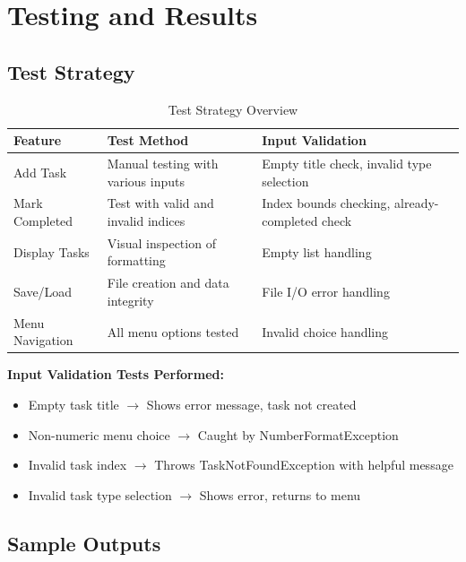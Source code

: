 \documentclass[12pt,a4paper]{article}
\begin{document}
\section{Testing and Results}

\subsection{Test Strategy}

\begin{table}[H]
\centering
\begin{tabular}{|l|p{4cm}|p{5cm}|}
\hline
\textbf{Feature} & \textbf{Test Method} & \textbf{Input Validation} \\
\hline
Add Task & Manual testing with various inputs & Empty title check, invalid type selection \\
\hline
Mark Completed & Test with valid and invalid indices & Index bounds checking, already-completed check \\
\hline
Display Tasks & Visual inspection of formatting & Empty list handling \\
\hline
Save/Load & File creation and data integrity & File I/O error handling \\
\hline
Menu Navigation & All menu options tested & Invalid choice handling \\
\hline
\end{tabular}
\caption{Test Strategy Overview}
\end{table}
\newpage
\textbf{Input Validation Tests Performed:}
\begin{itemize}
    \item Empty task title $\rightarrow$ Shows error message, task not created
    \item Non-numeric menu choice $\rightarrow$ Caught by NumberFormatException
    \item Invalid task index $\rightarrow$ Throws TaskNotFoundException with helpful message
    \item Invalid task type selection $\rightarrow$ Shows error, returns to menu
\end{itemize}

\subsection{Sample Outputs}
\end{document}
